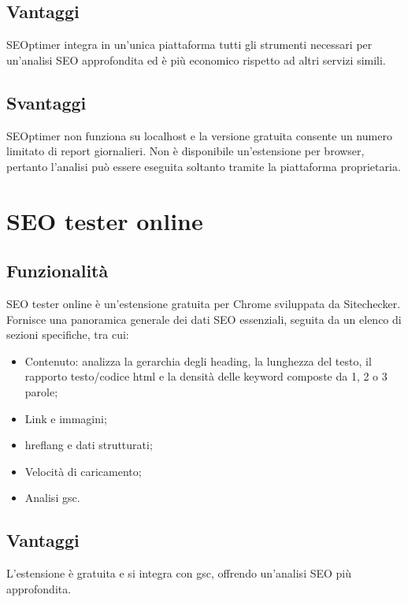 \subsection{Vantaggi}
\par SEOptimer integra in un'unica piattaforma tutti gli strumenti necessari per un'analisi SEO approfondita ed è più economico rispetto ad altri servizi simili.

\subsection{Svantaggi}
\par SEOptimer non funziona su \gls{localhost} e la versione gratuita consente un numero limitato di report giornalieri. Non è disponibile un'estensione per browser, pertanto l'analisi può essere eseguita soltanto tramite la piattaforma proprietaria.

\section{SEO tester online}

\subsection{Funzionalità}
\par SEO tester online è un'estensione gratuita per Chrome sviluppata da Sitechecker. Fornisce una panoramica generale dei dati SEO essenziali, seguita da un elenco di sezioni specifiche, tra cui:
\begin{itemize}
    \item Contenuto: analizza la gerarchia degli heading, la lunghezza del testo, il rapporto testo/codice \gls{html} e la densità delle keyword composte da 1, 2 o 3 parole;
    \item Link e immagini;
    \item \Gls{hreflang} e dati strutturati;
    \item Velocità di caricamento;
    \item Analisi \gls{gsc}.
\end{itemize}

\subsection{Vantaggi}
\par L'estensione è gratuita e si integra con \gls{gsc}, offrendo un'analisi SEO più approfondita.

